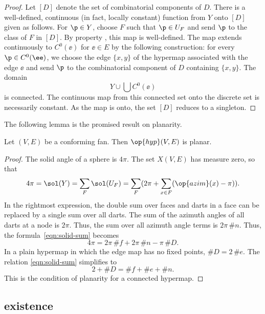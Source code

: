 \begin{proof} Let $[D]$ denote the set of combinatorial components of
  $D$.  There is a well-defined, continuous (in fact, locally
  constant) function from $Y$ onto $[D]$ given as follows.  For $\p\in
  Y$, choose $F$ such that $\p\in U_F$ and send $\p$ to the class of
  $F$ in $[D]$.  By property , this map is
  well-defined.  The map extends continuously to $C^0(\ee)$ for
  $\ee\in E$ by the following construction: for every $\p\in
  C^0(\ee)$, we choose the edge $\{x,y\}$ of the hypermap associated
  with the edge $\ee$ and send $\p$ to the combinatorial component of
  $D$ containing $\{x,y\}$. The domain
\[ 
Y\cup \bigcup C^0(\ee)
\] 
is connected.  The continuous map from this connected set onto the
discrete set is necessarily constant.  As the map is onto, the set
$[D]$ reduces to a singleton.
\end{proof}

The following lemma is the promised result on planarity.

\begin{lemma}[]  
\label{lemma:cfplanar}
Let $(V,E)$ be a conforming fan.  
Then $\op{hyp}(V,E)$ is planar.
\end{lemma}
%
%

\begin{proof}  The solid angle of a sphere is $4\pi$.  The set $X(V,E)$
has measure zero, so that
\begin{equation}\label{eqn:solid-sum}
4\pi = \sol(Y)= \sum_F \sol(U_F) = 
\sum_F ( 2\pi + \sum_{x\in F} (\op{azim}(x)-\pi) ).
\end{equation}
In the rightmost expression, the double sum over faces and darts in a
face can be replaced by a single sum over all darts.  The sum of the
azimuth angles of all darts at a node is $2\pi$. Thus, the sum over all azimuth
angle terms is $2\pi\,\#n$.  Thus, the formula~\eqref{eqn:solid-sum}
becomes
\[ 
4\pi = 2\pi\, \#f +2\pi\,\#n - \pi\, \#D.
\] 
In a plain hypermap in which the edge map has no fixed points, $\#D =
2\,\#e$.  The relation \eqref{eqn:solid-sum} simplifies to
\[ 
2 + \#D = \#f + \#e + \#n.
\] 
This is the condition of planarity for a connected hypermap.
\end{proof}
%

\subsection{existence}




